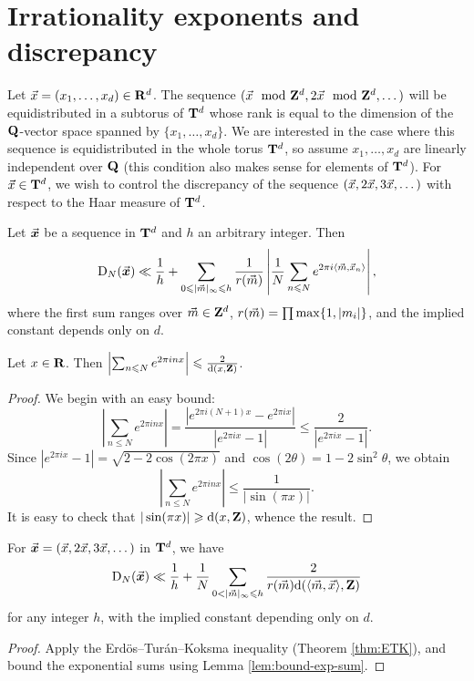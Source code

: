 \section{Irrationality exponents and discrepancy}

Let $\vec{x}=(x_1,\dots,x_d)\in \mathbf{R}^d$. The sequence 
$(\vec{x}\mod {\mathbf{Z}}^d,2\vec{x}\mod{\mathbf{Z}}^d,\dots)$ will be equidistributed in a subtorus of 
$\mathbf{T}^d$ whose rank is equal to the dimension of the $\mathbf{Q}$-vector space 
spanned by $\{x_1,\dots,x_d\}$. We are interested in the case where this 
sequence is equidistributed in the whole torus $\mathbf{T}^d$, so assume 
$x_1,\dots,x_d$ are linearly independent over $\mathbf{Q}$ (this condition also 
makes sense for elements of $\mathbf{T}^d$). For $\vec{x}\in \mathbf{T}^d$, we wish 
to control the discrepancy of the sequence $(\vec{x},2\vec{x},3\vec{x},\dots)$ with respect 
to the Haar measure of $\mathbf{T}^d$. 

\begin{theorem}\label{thm:ETK}
Let $\vec{\boldsymbol x}$ be a sequence in $\mathbf{T}^d$ and $h$ an arbitrary integer. Then 
\[
	\operatorname{D}_N(\vec{\boldsymbol x}) \ll \frac 1 h + \sum_{0\leqslant |\vec{m}|_\infty \leqslant h} \frac{1}{r(\vec{m})} \left| \frac 1 N \sum_{n\leqslant N} e^{2\pi i \langle \vec{m},\vec{x}_n\rangle}\right| ,
\]
where the first sum ranges over $\vec{m}\in \mathbf{Z}^d$, 
$r(\vec{m}) = \prod \max\{1,|m_i|\}$, and the implied constant depends only on $d$. 
\end{theorem}

\begin{lemma}\label{lem:bound-exp-sum}
Let $x\in \mathbf{R}$. Then 
$\left| \sum_{n\leqslant N} e^{2\pi i n x}\right| \leqslant \frac{2}{\mathrm{d}(x, \mathbf{Z})}$. 
\end{lemma}
\begin{proof}
We begin with an easy bound: 
\[
	\left| \sum_{n\leqslant N} e^{2\pi i n x}\right| = \frac{|e^{2\pi i (N+1) x} - e^{2\pi i x}|}{|e^{2\pi i x} - 1|} \leqslant \frac{2}{|e^{2\pi i x} - 1|} .
\]
Since $|e^{2\pi i x} - 1| = \sqrt{2-2\cos(2\pi x)}$ and 
$\cos(2\theta) = 1-2\sin^2\theta$, we obtain 
\[
	\left|\sum_{n\leqslant N} e^{2\pi i n x}\right| \leqslant \frac{1}{|\sin(\pi x)|} .
\]
It is easy to check that $|\sin(\pi x)| \geqslant \mathrm{d}(x,\mathbf{Z})$, whence the result.  
\end{proof}

\begin{corollary}\label{cor:bound-disc-distance}
For $\vec{\boldsymbol x}=(\vec{x},2\vec{x},3\vec{x},\dots)$ in $\mathbf{T}^d$, we have 
\[
	\D_N(\bvx) \ll \frac 1 h + \frac 1 N \sum_{0<|\vm|_\infty \leqslant h} \frac{2}{r(\vm) \dd(\langle \vm,\vx\rangle,\bZ)} 
\]
for any integer $h$, with the implied constant depending only on $d$. 
\end{corollary}
\begin{proof}
Apply the Erd\"os--Tur\'an--Koksma inequality (Theorem \ref{thm:ETK}), and 
bound the exponential sums using Lemma \ref{lem:bound-exp-sum}. 
\end{proof}

